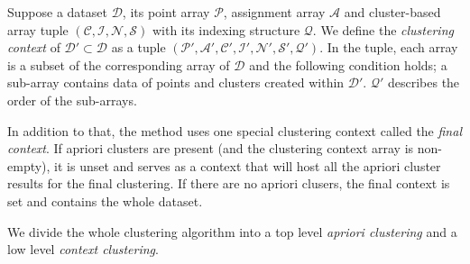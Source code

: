 \begin{defn}
	Suppose a dataset $\mathcal{D}$, its point array $\mathcal{P}$, assignment array $\mathcal{A}$ and cluster-based array tuple $(\mathcal{C},\mathcal{I},\mathcal{N},\mathcal{S})$ with its indexing structure $\mathcal{Q}$. We define the \emph{clustering context} of $\mathcal{D}' \subset \mathcal{D}$ as a tuple $(\mathcal{P'},\mathcal{A'},\mathcal{C'},\mathcal{I'},\mathcal{N'},\mathcal{S'},\mathcal{Q}')$. In the tuple, each array is a subset of the corresponding array of $\mathcal{D}$ and the following condition holds; a sub-array contains data of points and clusters created within $\mathcal{D}'$. $\mathcal{Q}'$ describes the order of the sub-arrays.
	\label{def03:context}
\end{defn}

In addition to that, the method uses one special clustering context called the \emph{final context}. If apriori clusters are present (and the clustering context array is non-empty), it is unset and serves as a context that will host all the apriori cluster results for the final clustering. If there are no apriori clusers, the final context is set and contains the whole dataset.

We divide the whole clustering algorithm into a top level \emph{apriori clustering} and a low level \emph{context clustering}.

